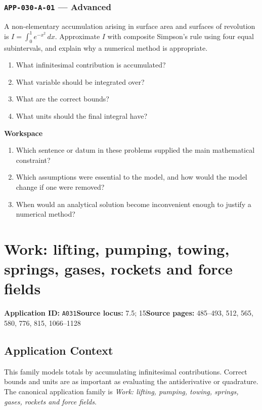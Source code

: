 \documentclass[11pt]{book}
\newcommand{\pid}[1]{\texttt{#1}}
\newcommand{\workspace}{\par\vspace{0.7in}\hrulefill\par\vspace{0.55in}\hrulefill\par}
\begin{document}
\subsection*{\pid{APP-030-A-01} — Advanced}
\begin{problembox}
A non-elementary accumulation arising in surface area and surfaces of revolution is $I=\int_0^1 e^{-x^2}\,dx$. Approximate $I$ with composite Simpson's rule using four equal subintervals, and explain why a numerical method is appropriate.
\end{problembox}
\begin{promptbox}\begin{enumerate}
\item What infinitesimal contribution is accumulated?
\item What variable should be integrated over?
\item What are the correct bounds?
\item What units should the final integral have?
\end{enumerate}\end{promptbox}
\textbf{Workspace}\workspace
\begin{reflectionbox}\begin{enumerate}
\item Which sentence or datum in these problems supplied the main mathematical constraint?
\item Which assumptions were essential to the model, and how would the model change if one were removed?
\item When would an analytical solution become inconvenient enough to justify a numerical method?
\end{enumerate}\end{reflectionbox}
\chapter{Work: lifting, pumping, towing, springs, gases, rockets and force fields}\label{app:A031}
\textbf{Application ID:} \pid{A031}\quad \textbf{Source locus:} 7.5; 15\quad \textbf{Source pages:} 485–493, 512, 565, 580, 776, 815, 1066–1128
\section*{Application Context}
This family models totals by accumulating infinitesimal contributions. Correct bounds and units are as important as evaluating the antiderivative or quadrature. The canonical application family is \emph{Work: lifting, pumping, towing, springs, gases, rockets and force fields}.
\end{document}
